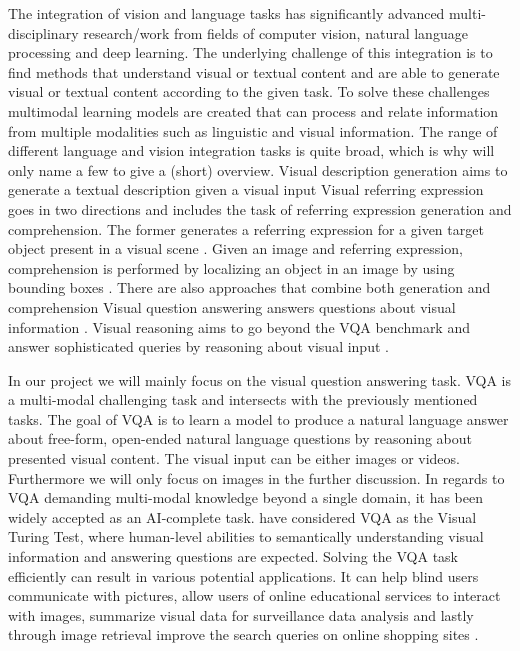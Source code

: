 \documentclass{article}
\begin{document}
The integration of vision and language tasks has significantly advanced multi-disciplinary research/work from fields of computer vision, natural language processing and deep learning. The underlying challenge of this integration is to find methods that understand visual or textual content and are able to generate visual or textual content according to the given task. To solve these challenges multimodal learning models are created that can process and relate information from multiple modalities such as linguistic and visual information. The range of different language and vision integration tasks is quite broad, which is why will only name a few to give a (short) overview. Visual description generation aims to generate a textual description given a visual input \citep{plummer2015vdg} Visual referring expression goes in two directions and includes the task of referring expression generation and comprehension. The former generates a referring expression for a given target object present in a visual scene \citep{fitzgerald2013learning}. Given an image and referring expression, comprehension is performed by localizing an object in an image by using bounding boxes \citep{nagaraja2016modeling}. There are also approaches that combine both generation and comprehension \citep{yu2016modeling} Visual question answering answers questions about visual information \citep{antol2015vqa}. Visual reasoning aims to go beyond the VQA benchmark and answer sophisticated queries by reasoning about visual input \citep{johnson2017clevr}.

In our project we will mainly focus on the visual question answering task. VQA is a  multi-modal challenging task and intersects with the previously mentioned tasks. The goal of VQA is to learn a model to produce a natural language answer about free-form, open-ended natural language questions by reasoning about presented visual content. The visual input can be either images or videos. Furthermore we will only focus on images in the further discussion. In regards to VQA demanding multi-modal knowledge beyond a single domain, it has been widely accepted as an AI-complete task. \cite{geman2015visual} have considered VQA as the Visual Turing Test, where human-level abilities to semantically understanding visual information and answering questions are expected. Solving the VQA task efficiently can result in various potential applications. It can help blind users communicate with pictures, allow users of online educational services to interact with images, summarize visual data for surveillance data analysis and lastly through image retrieval improve the search queries on online shopping sites \citep{manmadhan2020vqa}.
\end{document}
